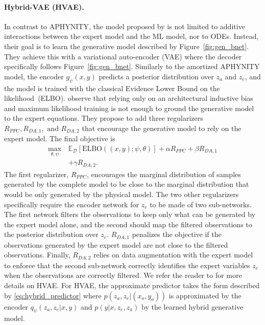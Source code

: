 \documentclass{article}
\newcommand\figref{Figure~\ref}
\begin{document}
\paragraph{Hybrid-VAE (HVAE).}
In contrast to APHYNITY, the model proposed by \citet{HVAE} is not limited to additive interactions between the expert model and the ML model, nor to ODEs. Instead, their goal is to learn the generative model described by \figref{fig:gen_bnet}. They achieve this with a variational auto-encoder (VAE) where the decoder specifically follows \figref{fig:gen_bnet}. Similarly to the amortized APHYNITY model, the encoder $g_\psi(x, y)$ predicts a posterior distribution over $z_a$ and $z_e$, and the model is trained with the classical Evidence Lower Bound on the likelihood~(ELBO). \citet{HVAE} observe that relying only on an architectural inductive bias and maximum likelihood training is not enough to ground the generative model to the expert equations. They propose to add three regularizers $R_{PPC}, R_{DA, 1},\text{ and } R_{DA, 2}$ that encourage the generative model to rely on the expert model. The final objective is 
\begin{align}
    \max_{\theta, \psi}\, &\mathbb{E}_{\mathcal{D}}\left[ \text{ELBO} ((x, y); \psi, \theta)\right] + \alpha R_{PPC} + \beta R_{DA, 1} \nonumber \\&+ \gamma R_{DA, 2}. \label{eq:hvae_loss}
\end{align}
The first regularizer, $R_{PPC}$, encourages the marginal distribution of samples generated by the complete model to be close to the marginal distribution that would be only generated by the physical model. The two other regularizers specifically require the encoder network for $z_e$ to be made of two sub-networks. The first network filters the observations to keep only what can be generated by the expert model alone, and the second should map the filtered observations to the posterior distribution over $z_e$. $R_{DA, 1}$ penalizes the objective if the observations generated by the expert model are not close to the filtered observations. Finally, $R_{DA, 2}$ relies on data augmentation with the expert model to enforce that the second sub-network correctly identifies the expert variables $z_e$ when the observations are correctly filtered. We refer the reader to \citet{HVAE} for more details on HVAE. For HVAE, the approximate predictor takes the form described by \eqref{eq:hybrid_predictor} where $p(z_a, z_e|(x_o, y_o))$ is approximated by the encoder $q_\psi(z_a, z_e|x, y)$ and $p(y|x, z_e, z_a)$ by the learned hybrid generative model.
\end{document}
